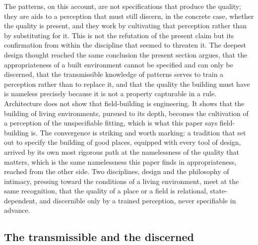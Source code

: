 The patterns, on this account, are not specifications that produce the quality; they are aids to a perception that must still discern, in the concrete case, whether the quality is present, and they work by cultivating that perception rather than by substituting for it. This is not the refutation of the present claim but its confirmation from within the discipline that seemed to threaten it. The deepest design thought reached the same conclusion the present section argues, that the appropriateness of a built environment cannot be specified and can only be discerned, that the transmissible knowledge of patterns serves to train a perception rather than to replace it, and that the quality the building must have is nameless precisely because it is not a property capturable in a rule. Architecture does not show that field-building is engineering. It shows that the building of living environments, pursued to its depth, becomes the cultivation of a perception of the unspecifiable fitting, which is what this paper says field-building is. The convergence is striking and worth marking: a tradition that set out to specify the building of good places, equipped with every tool of design, arrived by its own most rigorous path at the namelessness of the quality that matters, which is the same namelessness this paper finds in appropriateness, reached from the other side. Two disciplines, design and the philosophy of intimacy, pressing toward the conditions of a living environment, meet at the same recognition, that the quality of a place or a field is relational, state-dependent, and discernible only by a trained perception, never specifiable in advance.

\subsection{The transmissible and the discerned}
\label{p22:sub:eng-transmissible}

